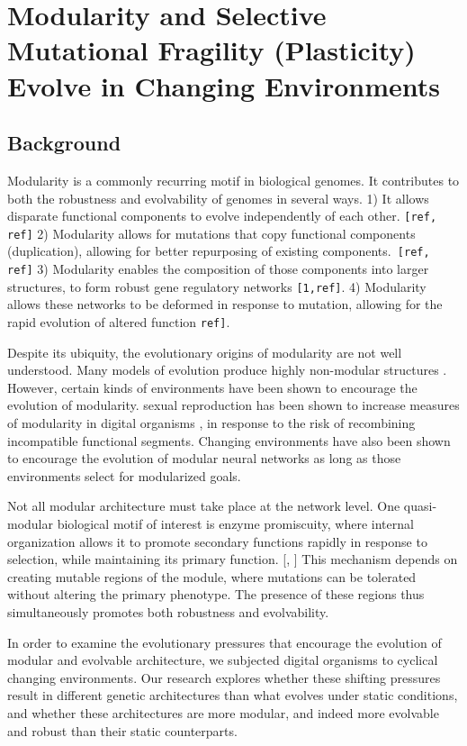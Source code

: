 \section{Modularity and Selective Mutational Fragility (Plasticity) Evolve in Changing Environments}
\subsection{Background}

Modularity is a commonly recurring motif in biological genomes. It contributes to both the robustness and evolvability of genomes in several ways. 1) It allows disparate functional components to evolve independently of each other. \verb|[ref, ref]| 2) Modularity allows for mutations that copy functional components (duplication), allowing for better repurposing of existing components.\verb| [ref, ref]| 3) Modularity enables the composition of those components into larger structures, to form robust gene regulatory networks \verb|[1,ref]|. 4) Modularity allows these networks to be deformed in response to mutation, allowing for the rapid evolution of altered function \cite{mody_modularity_2009} \verb|ref]|.

Despite its ubiquity, the evolutionary origins of modularity are not well understood. Many models of evolution produce highly non-modular structures \cite{kashtan_spontaneous_2005}. However, certain kinds of environments have been shown to encourage the evolution of modularity. sexual reproduction has been shown to increase measures of modularity in digital organisms \cite{misevic_sexual_2006}, in response to the risk of recombining incompatible functional segments. Changing environments have also been shown to encourage the evolution of modular neural networks \cite{kashtan_spontaneous_2005} as long as those environments select for modularized goals. 

Not all modular architecture must take place at the network level. One quasi-modular biological motif of interest is enzyme promiscuity, where internal organization allows it to promote secondary functions rapidly in response to selection, while maintaining its primary function. [\cite{aharoni_evolvability_2005}, \cite{khersonsky_enzyme_2006}] This mechanism depends on creating mutable regions of the module, where mutations can be tolerated without altering the primary phenotype. The presence of these regions thus simultaneously promotes both robustness and evolvability.

In order to examine the evolutionary pressures that encourage the evolution of modular and evolvable architecture, we subjected digital organisms to cyclical changing environments. Our research explores whether these shifting pressures result in different genetic architectures than what evolves under static conditions, and whether these architectures are more modular, and indeed more evolvable and robust than their static counterparts.